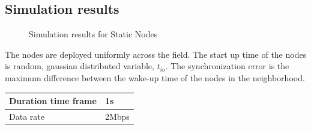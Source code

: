 \documentclass[journal]{IEEEtran}
\begin{document}
\subsection{\textbf{Simulation results}}
\begin{figure}
\centerline{
\hfil
{}}
\caption{Simulation results for Static Nodes }
\label{static}
\end{figure}
The nodes are deployed uniformly across the field.%
The start up time of the nodes is random, gaussian distributed variable, $t_{io}$. The
synchronization error is the maximum difference between the wake-up time of the nodes in the
neighborhood.
\begin{center}
    \begin{tabular}{ | l | l |}
    \hline
    Duration time frame & 1s \\ \hline
    Data rate &  2Mbps \\ \hline
    \end{tabular}
\end{center}
\end{document}

